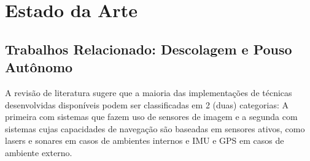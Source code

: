 
\section{Estado da Arte}





\subsection{Trabalhos Relacionado: Descolagem e Pouso Autônomo}



	
	
	A revisão de literatura sugere que a maioria das implementações de técnicas desenvolvidas disponíveis podem ser classificadas em 2 (duas) categorias: A primeira com sistemas que fazem uso de sensores de imagem e a segunda com sistemas cujas capacidades de navegação são baseadas em sensores ativos, como lasers e sonares em casos de ambientes internos e IMU e GPS em casos de ambiente externo.
	
